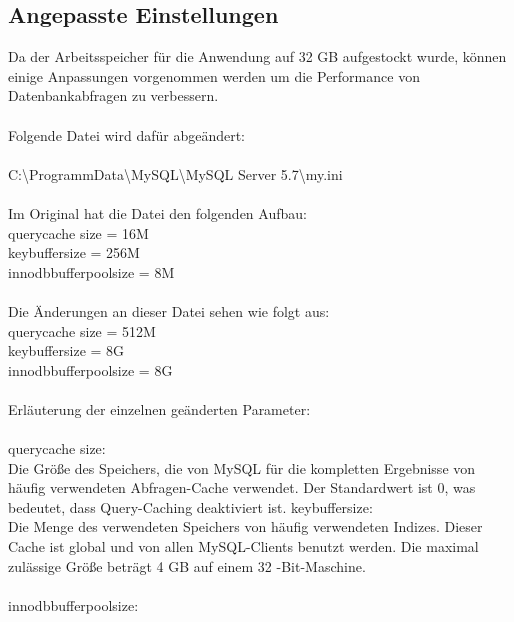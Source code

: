 \subsection{Angepasste Einstellungen}
Da der Arbeitsspeicher für die Anwendung auf 32 GB aufgestockt wurde, können einige Anpassungen vorgenommen werden um die Performance von Datenbankabfragen zu verbessern.
\\\\
Folgende Datei wird dafür abgeändert: \\\\
C:\textbackslash ProgrammData\textbackslash MySQL\textbackslash MySQL Server 5.7\textbackslash my.ini \\\\
Im Original hat die Datei den folgenden Aufbau:
\\
query\underline \space cache \underline \space size = 16M
\\
key\underline \space buffer\underline \space size = 256M
\\
innodb\underline \space buffer\underline \space pool\underline \space size = 8M
\\\\
Die Änderungen an dieser Datei sehen wie folgt aus:
\\
query\underline \space cache \underline \space size = 512M
\\
key\underline \space buffer\underline \space size = 8G
\\
innodb\underline \space buffer\underline \space pool\underline \space size = 8G
\\\\
Erläuterung der einzelnen geänderten Parameter:
\\\\
query\underline \space cache \underline \space size:
\\
Die Größe des Speichers, die von MySQL für die kompletten Ergebnisse von häufig verwendeten Abfragen-Cache verwendet. Der Standardwert ist 0, was bedeutet, dass Query-Caching deaktiviert ist.
\newpage 
key\underline \space buffer\underline \space size:
\\
Die Menge des verwendeten Speichers von häufig verwendeten Indizes. Dieser Cache ist global und von allen MySQL-Clients benutzt werden. Die maximal zulässige Größe beträgt 4 GB auf einem 32 -Bit-Maschine.
\\\\
innodb\underline \space buffer\underline \space pool\underline \space size:
\\
